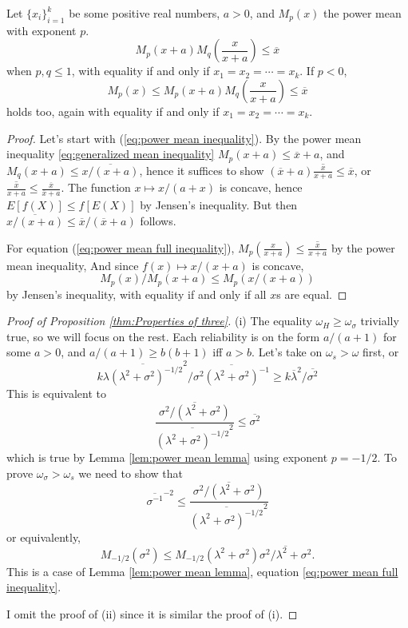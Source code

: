 \documentclass[twoside]{article}
\begin{document}
\begin{lem}
\label{lem:power mean lemma}Let $\{ x_{i}\} _{i=1}^{k}$
be some positive real numbers, $a>0$, and $M_{p}(x)$
the power mean with exponent $p$. 
\begin{equation}
M_{p}(x+a)M_{q}\left(\frac{x}{x+a}\right)\leq\overline{x}\label{eq:power mean inequality}
\end{equation}
when $p,q\leq1$, with equality if and only if $x_{1}=x_{2}=\cdots=x_{k}$.
If $p<0$, 
\begin{equation}
M_{p}(x)\leq M_{p}(x+a)M_{q}\left(\frac{x}{x+a}\right)\leq\overline{x}\label{eq:power mean full inequality}
\end{equation}
holds too, again with equality if and only if $x_{1}=x_{2}=\cdots=x_{k}$.
\end{lem}

\begin{proof}
Let's start with (\ref{eq:power mean inequality}). By the power
mean inequality \ref{eq:generalized mean inequality}  $M_{p}(x+a)\leq\overline{x}+a$, and $M_{q}(x+a)\leq\overline{x/(x+a)}$,
hence it suffices to show $(\overline{x}+a)\overline{\frac{x}{x+a}}\leq\overline{x}$,
or $\overline{\frac{x}{x+a}}\leq\frac{\overline{x}}{\overline{x}+a}$.
The function $x\mapsto x/(a+x)$ is concave, hence $E[f(X)]\leq f[E(X)]$
by Jensen's inequality. But then $\overline{x/(x+a)}\leq\overline{x}/(\overline{x}+a)$
follows.

For equation (\ref{eq:power mean full inequality}), $M_{p}(\frac{x}{x+a})\leq\overline{\frac{x}{x+a}}$
by the power mean inequality, And since $f(x)\mapsto x/(x+a)$
is concave,
\[
M_{p}(x)/M_{p}(x+a)\leq M_{p}(x/(x+a))
\]
by Jensen's inequality, with equality if and only if all $x$s are
equal.
\end{proof}

\begin{proof}[Proof of Proposition \ref{thm:Properties of three}]\label{proof:Properties}
(i) The equality $\omega_H \geq \omega_\sigma$ trivially true, so we will focus on the rest. Each reliability is on the form $a/(a+1)$ for some $a>0$, and $a/(a+1)\geq b(b+1)$
iff $a>b$. Let's take on $\omega_s > \omega$ first, or
\[
k\overline{\lambda(\lambda^{2}+\sigma^{2})^{-1/2}}^{2}/\overline{\sigma^{2}(\lambda^{2}+\sigma^{2})^{-1}}\geq k\overline{\lambda}^{2}/\overline{\sigma^{2}}
\]
This is equivalent to 
\[
\frac{\overline{\sigma^{2}/(\lambda^{2}+\sigma^{2})}}{\overline{(\lambda^{2}+\sigma^{2})^{-1/2}}^{2}}\leq\overline{\sigma^{2}}
\]
which is true by Lemma \ref{lem:power mean lemma} using exponent $p = -1/2$.
To prove $\omega_{\sigma}>\omega_{s}$ we need to show that
\[
\overline{\sigma^{-1}}^{-2}\leq\frac{\overline{\sigma^{2}/(\lambda^{2}+\sigma^{2})}}{\overline{(\lambda^{2}+\sigma^{2})^{-1/2}}^{2}}
\]
or equivalently,
\[
M_{-1/2}(\sigma^{2})\leq M_{-1/2}(\lambda^{2}+\sigma^{2})\overline{\sigma^{2}/\lambda^{2}+\sigma^{2}}.
\]
This is a case of Lemma \ref{lem:power mean lemma}, equation \eqref{eq:power mean full inequality}.

I omit the proof of (ii) since it is similar the proof of (i).
\end{proof}
\end{document}

